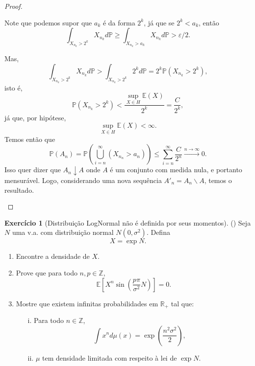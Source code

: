 \documentclass[12pt,a4paper,oneside]{book}
\theoremstyle{definition}
\newtheorem{xca}[theorem]{Exerc\'icio}
\theoremstyle{remark}
\numberwithin{equation}{section}
\newcommand{\R}{\mathbb{R}}
\newcommand{\e}{\varepsilon}
\newcommand{\E}{\mathbb{E}}
\newcommand{\pr}{\mathbb{P}}
\newcommand{\rarrowlimn}{\xrightarrow{n\rightarrow \infty}}
\begin{document}
\begin{proof}
\begin{itemize}
Note que podemos supor que $a_k$ é da forma $2^k$, já que se $2^k<a_k$, então
$$\int_{X_{n_k}>2^k} X_{n_k}d\pr \geq  \int_{X_{n_k}>a_k}X_{n_k}d\pr >\e/2. $$

Mas, 
$$\int_{X_{n_k}>2^k} X_{n_k}d\pr > \int_{X_{n_k}>2^k} 2^k d\pr  = 2^k \pr(X_{n_k}>2^k),$$
isto é,
$$\pr(X_{n_k}>2^k) < \dfrac{\sup_{X\in H}\E(X)}{2^k} = \dfrac{C}{2^k}, $$
já que, por hipótese,
$$ \sup_{X\in H}\E(X)<\infty.$$
Temos então que
$$\pr(A_n) = \pr(\bigcup_{i=n}^\infty(X_{n_n} >a_n) )\leq \sum_{i=n}^\infty \dfrac{C}{2^n} \rarrowlimn 0. $$
Isso quer dizer que $A_n \downarrow A$ onde $A$ é um conjunto com medida nula, e portanto mensurável. Logo, considerando uma nova sequência  $A'_n  = A_n\backslash A$, temos o resultado.

\end{itemize}



\end{proof}


\begin{xca}[Distribuição LogNormal não é definida por seus momentos](\cite{chaumont_yor_2012}) Seja $N$ uma v.a. com distribuição normal $N(0,\sigma^2).$ Defina
$$X = \exp N. $$
\begin{enumerate}
\item Encontre a densidade de $X$.
\item  Prove que para todo $n,p\in \mathbb{Z}$,
$$\E\left[  X^n \sin \left( \dfrac{p\pi}{\sigma^2}N \right)  \right]=0. $$ 
\item Mostre que existem infinitas probabilidades em $\R_+$ tal que:
\begin{itemize}
\item[i.] Para todo $n\in \mathbb{Z}$,
$$\int x^n d\mu(x) = \exp\left( \dfrac{n^2\sigma^2}{2}\right),   $$
\item[ii. ]$\mu$ tem densidade limitada com respeito à lei de $\exp N.$  
\end{itemize}
\end{enumerate}
\end{xca}
\end{document}
